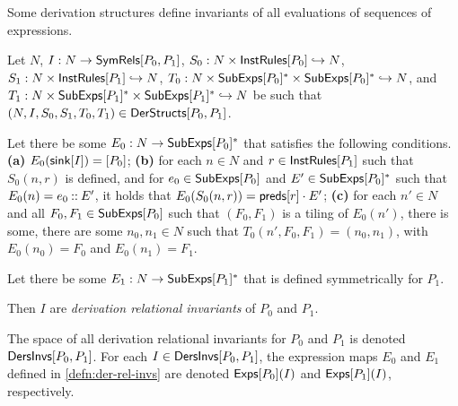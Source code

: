 Some derivation structures define invariants of all evaluations of
sequences of expressions.
\begin{defn}
  \label{defn:der-rel-invs}
  Let $N$, $I : N \to \mathsf{SymRels}[ P_0, P_1 ]$, %
  $S_0 : N \times \mathsf{InstRules}[ P_0 ] \hookrightarrow N$, %
  $S_1 : N \times \mathsf{InstRules}[ P_1 ] \hookrightarrow N$, %
  $T_0 : N \times \mathsf{SubExps}[ P_0 ]^{*} \times \mathsf{SubExps}[ P_0 ]^{*} \hookrightarrow
  N$, and %
  $T_1 : N \times \mathsf{SubExps}[ P_1 ]^{*} \times \mathsf{SubExps}[ P_1 ]^{*} \hookrightarrow
  N$ be such that $(N, I, S_0, S_1, T_0, T_1) \in
  \mathsf{DerStructs}[ P_0, P_1 ]$.

  Let there be some $E_0 : N \to \mathsf{SubExps}[ P_0 ]^{*}$ that satisfies the
  following conditions.
  \textbf{(a)} $E_0(\mathsf{sink}[ I ]) = [ P_0 ]$;
  \textbf{(b)} for each $n \in N$ and $r \in \mathsf{InstRules}[ P_1 ]$ such
  that $S_0(n, r)$ is defined, and for $e_0 \in \mathsf{SubExps}[ P_0 ]$ and $E'
  \in \mathsf{SubExps}[ P_0 ]^{*}$ such that $E_0(n) = e_0 \mathbin{::} E'$, it holds
  that $E_0( S_0(n, r) ) = \mathsf{preds}[ r ] \cdot E'$;
  \textbf{(c)} for each $n' \in N$ and all $F_0, F_1 \in
  \mathsf{SubExps}[ P_0 ]$ such that $(F_0, F_1)$ is a tiling of $E_0(n')$,
  there is some, there are some $n_0, n_1 \in N$ such that $T_0(n',
  F_0, F_1) = (n_0, n_1)$, with $E_0(n_0) = F_0$ and $E_0(n_1) =
  F_1$.

  Let there be some $E_1 : N \to \mathsf{SubExps}[ P_1 ]^{*}$ that is defined
  symmetrically for $P_1$.

  Then $I$ are \emph{derivation relational invariants} of $P_0$ and
  $P_1$.
\end{defn}
%
The space of all derivation relational invariants for $P_0$ and $P_1$
is denoted $\mathsf{DersInvs}[ P_0, P_1 ]$.
%
For each $I \in \mathsf{DersInvs}[ P_0, P_1 ]$, the expression maps $E_0$ and
$E_1$ defined in \autoref{defn:der-rel-invs} are denoted
$\mathsf{Exps}[ P_0 ]( I )$ and $\mathsf{Exps}[ P_1 ]( I )$, respectively.
%

